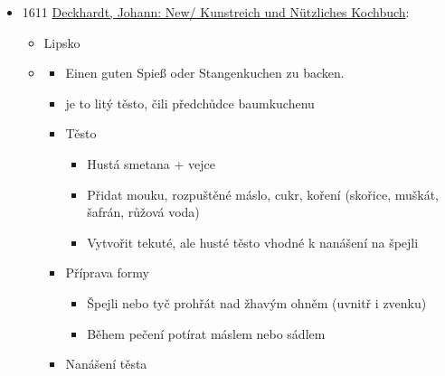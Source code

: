 \begin{itemize}
  \begin{itemize}
  \tightlist
  \item
  \item
    německá kuchařka, je tam  na klasickej spiesskuchen
    z vyválenýho pruhu těsta
  \item
    a hlavně v názvu používá jak spiesskuchen, tak eyerkuchen
  \item
    překlad: \hyperref[250605-2334]{Einen Eyerkuchen oder Spißkuchen zu
    machen.}
  \item
    v podstatě je to stejnej recept jako v Klosterkochbuch, jen vynechal
    úvod a poznámku, že se může namáčet v třešňový omáčce
  \end{itemize}
\item
  1611
  \href{https://www.deutschestextarchiv.de/book/view/deckhardt_kochbuch_1611/?p=264&hl=Spie\%C3\%9Fkuchen}{Deckhardt,
  Johann: New/ Kunstreich und Nützliches Kochbuch}:

  \begin{itemize}
  \tightlist
  \item
    Lipsko
  \item

    \begin{itemize}
    \tightlist
    \item
      Einen guten Spieß oder Stangenkuchen zu backen.
    \item
      je to litý těsto, čili předchůdce baumkuchenu
    \item
      Těsto

      \begin{itemize}
      \tightlist
      \item
        Hustá smetana + vejce
      \item
        Přidat mouku, rozpuštěné máslo, cukr, koření (skořice, muškát,
        šafrán, růžová voda)
      \item
        Vytvořit tekuté, ale husté těsto vhodné k nanášení na špejli
      \end{itemize}
    \item
      Příprava formy

      \begin{itemize}
      \tightlist
      \item
        Špejli nebo tyč prohřát nad žhavým ohněm (uvnitř i zvenku)
      \item
        Během pečení potírat máslem nebo sádlem
      \end{itemize}
    \item
      Nanášení těsta


\end{itemize}
\end{itemize}
\end{itemize}
